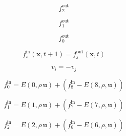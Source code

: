 \documentclass[a4paper,11pt]{article}
\newcommand{\vect}[1]{\boldsymbol{#1}}
\begin{document}
\begin{equation}
f_2^\mathrm{out}
\end{equation}

\begin{equation}
f_1^\mathrm{out}
\end{equation}

\begin{equation}
f_0^\mathrm{out}
\end{equation}

\begin{equation}
f_i^\mathrm{in}(\vect{x},t+1) = f_j^\mathrm{out}(\vect{x},t)
\end{equation}

\begin{equation}
v_i = -v_j
\end{equation}

\begin{equation}
f_0^\mathrm{in} = E(0,\rho\,\vect{u}) + (f_8^\mathrm{in}-E(8,\rho,\vect{u}))
\end{equation}

\begin{equation}
f_1^\mathrm{in} = E(1,\rho\,\vect{u}) + (f_7^\mathrm{in}-E(7,\rho,\vect{u}))
\end{equation}

\begin{equation}
f_2^\mathrm{in} = E(2,\rho\,\vect{u}) + (f_6^\mathrm{in}-E(6,\rho,\vect{u}))
\end{equation}
\end{document}
